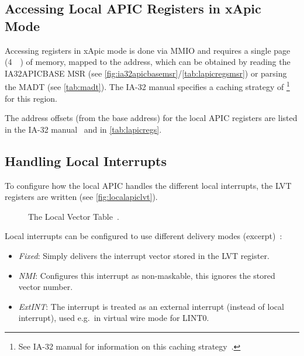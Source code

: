 \subsection{Accessing Local APIC Registers in xApic Mode}
\label{subsec:xapicregacc}

Accessing registers in xApic mode is done via MMIO and requires a single page (\SI{4}{\kilo\byte}) of memory, mapped to the  address, which can be obtained by reading the IA32\textunderscore{}APIC\textunderscore{}BASE MSR (see \autoref{fig:ia32apicbasemsr}/\autoref{tab:lapicregsmsr}) or parsing the MADT (see \autoref{tab:madt}).
The IA-32 manual specifies a caching strategy of \footnote{
  See IA-32 manual for information on this caching strategy~\autocite[sec.~3.12.3]{ia32}.}
~\autocite[sec.~3.11.4.1]{ia32} for this region.

The address offsets (from the base address) for the local APIC registers are listed in the IA-32 manual~\autocite[sec.~3.11.4.1]{ia32} and in \autoref{tab:lapicregs}.

\subsection{Handling Local Interrupts}
\label{subsec:lapiclvtinit}

To configure how the local APIC handles the different local interrupts, the LVT registers are written (see \autoref{fig:localapiclvt}).

\begin{figure}[h]
  \centering
  \begin{subfigure}[b]{0.7\textwidth}
    
  \end{subfigure}
  \caption{The Local Vector Table~\autocite[sec.~3.11.5.1]{ia32}.}
  \label{fig:localapiclvt}
\end{figure}

Local interrupts can be configured to use different delivery modes (excerpt)~\autocite[sec.~3.11.5.1]{ia32}:

\begin{itemize}
  \item \textit{Fixed}: Simply delivers the interrupt vector stored in the LVT register.
  \item \textit{NMI}: Configures this interrupt as non-maskable, this ignores the stored vector number.
  \item \textit{ExtINT}: The interrupt is treated as an external interrupt (instead of local interrupt), used e.g.\ in virtual wire mode for LINT0\@.
\end{itemize}

